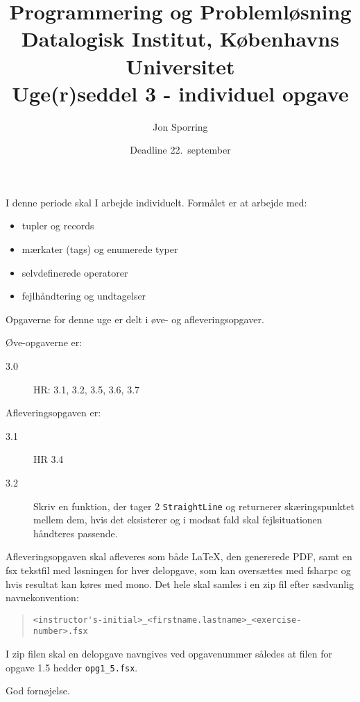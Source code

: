 \documentclass[a4paper,12pt]{article}
\title{Programmering og Problemløsning\\Datalogisk Institut,
  Københavns Universitet\\Uge(r)seddel 3 - individuel opgave}
\author{Jon Sporring}
\date{Deadline  22.\ september}
\begin{document}
\maketitle

I denne periode skal I arbejde individuelt. Formålet er at arbejde med:
\begin{itemize}
\item tupler og records
\item mærkater (tags) og enumerede typer
\item selvdefinerede operatorer
\item fejlhåndtering og undtagelser
\end{itemize}

Opgaverne for denne uge er delt i øve- og afleveringsopgaver. 

Øve-opgaverne er:
\begin{description}
\item[3.0] HR: 3.1, 3.2, 3.5, 3.6, 3.7 
\end{description}

Afleveringsopgaven er:
\begin{description}
\item[3.1] HR  3.4
\item[3.2] Skriv en funktion, der tager 2 \lstinline|StraightLine| og
  returnerer skæringspunktet mellem dem, hvis det eksisterer og i
  modsat fald skal fejlsituationen håndteres passende.
\end{description}
Afleveringsopgaven skal afleveres som både LaTeX, den genererede PDF, samt en fsx tekstfil med løsningen for hver delopgave, som kan oversættes med fsharpc og hvis resultat kan køres med mono. Det hele skal samles i en zip fil efter sædvanlig navnekonvention:
\begin{quote}
  \lstinline|<instructor's-initial>_<firstname.lastname>_<exercise-number>.fsx|
\end{quote}
I zip filen skal en delopgave navngives ved opgavenummer således at filen for opgave 1.5 hedder \lstinline|opg1_5.fsx|.

\flushright God fornøjelse.
\end{document}
